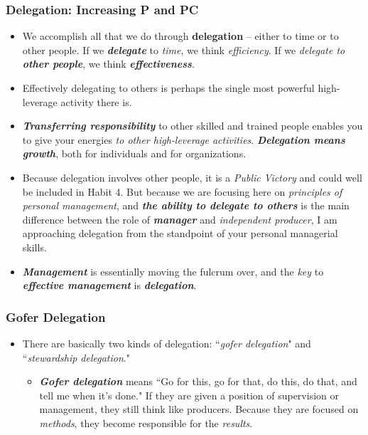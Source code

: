 \documentclass[11pt]{article}
\begin{document}
\subsubsection{Delegation: Increasing P and PC}
\begin{itemize}
\item We accomplish all that we do through \textbf{delegation} -- either to time or to other people. If we \emph{\textbf{delegate}} to \emph{time}, we think \emph{efficiency}. If we \emph{delegate to \textbf{other people}}, we think \emph{\textbf{effectiveness}}.

\item Effectively delegating to others is perhaps the single most powerful high-leverage activity there is.

\item \emph{\textbf{Transferring responsibility}} to other skilled and trained people enables you to give your energies \emph{to other high-leverage activities}. \emph{\textbf{Delegation means growth}}, both for individuals and for organizations.

\item Because delegation involves other people, it is a \emph{Public Victory} and could well be included in Habit 4. But because we are focusing here on \emph{principles of personal management}, and \emph{\textbf{the ability to delegate to others}} is the main difference between the role of \emph{\textbf{manager}} and \emph{independent producer}, I am approaching delegation from the standpoint of your personal managerial skills.

\item \emph{\textbf{Management}} is essentially moving the fulcrum over, and the \emph{key} to \emph{\textbf{effective management}} is \textbf{\emph{delegation}}.
\end{itemize}
\subsubsection{Gofer Delegation}
\begin{itemize}
\item There are basically two kinds of delegation: ``\emph{gofer delegation}" and ``\emph{stewardship delegation}."
\begin{itemize}
\item \emph{\textbf{Gofer delegation}} means ``Go for this, go for that, do this, do that, and tell me when it's done."  If they are given a position of supervision or management, they still think like producers. Because they are focused on \emph{methods}, they become responsible for the \emph{results}.
\end{itemize}
\end{itemize}
\end{document}
